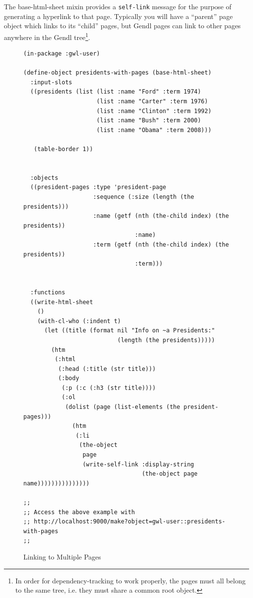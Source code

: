 \documentclass [11pt]{book}
\begin{document}
The base-html-sheet mixin provides a \texttt{self-link} message for the purpose of generating a hyperlink to that
page. Typically you will have a ``parent'' page object which links to
its ``child'' pages, but Gendl pages can link to other pages anywhere
in the Gendl tree\footnote{In order for dependency-tracking to work
properly, the pages must all belong to the same tree, i.e. they must
share a common root object.}.
\begin{figure}
\begin{lrbox}{\boxedverb}
\begin{minipage}{\linewidth}
\tiny{

\begin{verbatim}(in-package :gwl-user)

(define-object presidents-with-pages (base-html-sheet)
  :input-slots
  ((presidents (list (list :name "Ford" :term 1974)
                     (list :name "Carter" :term 1976)
                     (list :name "Clinton" :term 1992)
                     (list :name "Bush" :term 2000)
                     (list :name "Obama" :term 2008)))
   
   (table-border 1))
  
  
  :objects
  ((president-pages :type 'president-page
                    :sequence (:size (length (the presidents)))
                    :name (getf (nth (the-child index) (the presidents))
                                :name)
                    :term (getf (nth (the-child index) (the presidents))
                                :term)))


  :functions
  ((write-html-sheet
    () 
    (with-cl-who (:indent t)
      (let ((title (format nil "Info on ~a Presidents:" 
                           (length (the presidents)))))
        (htm
         (:html 
          (:head (:title (str title)))
          (:body 
           (:p (:c (:h3 (str title))))
           (:ol
            (dolist (page (list-elements (the president-pages)))
              (htm      
               (:li
                (the-object 
                 page 
                 (write-self-link :display-string 
                                  (the-object page name)))))))))))))))

;;
;; Access the above example with 
;; http://localhost:9000/make?object=gwl-user::presidents-with-pages
;;

\end{verbatim}}
\end{minipage}
\end{lrbox}
\fbox{\usebox{\boxedverb}}

\caption{Linking to Multiple Pages}

\label{fig:gwl-3}

\end{figure}
\end{document}
